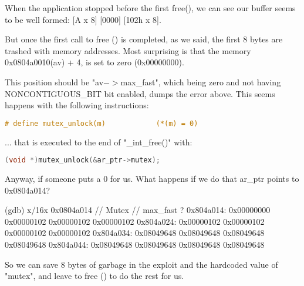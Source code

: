 \documentclass[12pt]{article}
\begin{document}
When the application stopped before the first free(), we can see our
buffer seems to be well formed: [A x 8] [0000] [102h x 8].
\newline


But once the first call to free () is completed, as we said, the first 8
bytes are trashed with memory addresses. Most surprising is that the
memory 0x0804a0010(av) + 4, is set to zero (0x00000000).
\newline


This position should be "av$->$max\_fast", which being zero and not having
NONCONTIGUOUS\_BIT bit enabled, dumps the error above. This seems happens
with the following instructions:
\newline

\begin{lstlisting}[language=C]
   # define mutex_unlock(m)            (*(m) = 0)
\end{lstlisting}


... that is executed to the end of "\_int\_free()" with:
\newline


\begin{lstlisting}[language=C]
   (void *)mutex_unlock(&ar_ptr->mutex);
\end{lstlisting}



Anyway, if someone puts a 0 for us. What happens if we do that ar\_ptr
points to 0x0804a014?
\newline

\begin{verbnobox}[\small]
(gdb) x/16x 0x0804a014
                // Mutex       // max\_fast ?
0x804a014:	0x00000000	0x00000102	0x00000102	0x00000102
0x804a024:	0x00000102	0x00000102	0x00000102	0x00000102
0x804a034:	0x08049648	0x08049648	0x08049648	0x08049648
0x804a044:	0x08049648	0x08049648	0x08049648	0x08049648
\end{verbnobox}



So we can save 8 bytes of garbage in the exploit and the hardcoded value
of "mutex", and leave to free () to do the rest for us.
\newline


\end{document}
